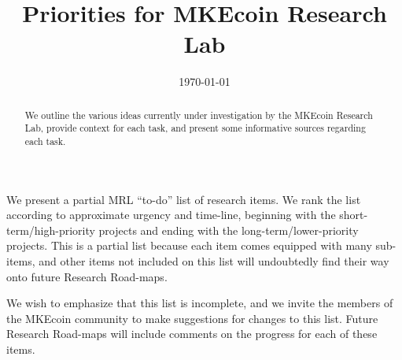 \documentclass[12pt,english]{mrl}
\theoremstyle{definition}
\numberwithin{equation}{section}
\numberwithin{figure}{section}
\numberwithin{equation}{section}
\numberwithin{equation}{section}
\numberwithin{figure}{section}
\begin{document}
\begin{frontmatter}

\begin{fmbox}
\hfill\setlength{\fboxrule}{0px}\setlength{\fboxsep}{5px}
\title{Priorities for MKEcoin Research Lab}
\date{\today}
\author[
   addressref={mrl},
   email={bggoode@g.clemson.edu}
]{ }


\address[id=mrl]{
}
\end{fmbox}

\begin{abstractbox}
\begin{abstract}
We outline the various ideas currently under investigation by the MKEcoin Research Lab, provide context for each task, and present some informative sources regarding each task. \end{abstract}
\end{abstractbox}
\end{frontmatter}

We present a partial  MRL ``to-do'' list of research items. We rank the list according to approximate urgency and time-line, beginning with the short-term/high-priority projects and ending with the long-term/lower-priority projects. This is a partial list because each item comes equipped with many sub-items, and other items not included on this list will undoubtedly find their way onto future Research Road-maps.  

We wish to emphasize that this list is incomplete, and we invite the members of the MKEcoin community to make suggestions for changes to this list. Future Research Road-maps will include comments on the progress for each of these items. 


\vspace{0.1in}
\end{document}
